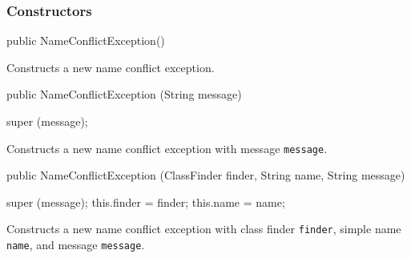 \subsubsection* {Constructors}
\begin{code} 

   public NameConflictException()\begin{hide} {}\end{hide}
\end{code}
\begin{tabb}   Constructs a new name conflict exception.
\end{tabb}
\begin{code}

   public NameConflictException (String message)\begin{hide} {
      super (message);
   }\end{hide}
\end{code}
\begin{tabb}   Constructs a new name conflict exception with
 message \texttt{message}.
\end{tabb}
\begin{htmlonly}
\end{htmlonly}
\begin{code}

   public NameConflictException (ClassFinder finder, String name,
                                 String message)\begin{hide} {
      super (message);
      this.finder = finder;
      this.name = name;
   }\end{hide}
\end{code}
\begin{tabb}   Constructs a new name conflict exception with class
 finder \texttt{finder}, simple name \texttt{name},
 and message \texttt{message}.
\end{tabb}
\begin{htmlonly}
\end{htmlonly}

